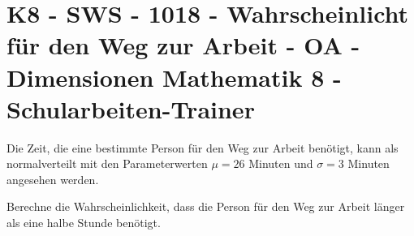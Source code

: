 \section{K8 - SWS - 1018 - Wahrscheinlicht für den Weg zur Arbeit - OA - Dimensionen Mathematik 8 - Schularbeiten-Trainer}

\begin{beispiel}[K8 - SWS]{1}
Die Zeit, die eine bestimmte Person für den Weg zur Arbeit benötigt, kann als normalverteilt mit den Parameterwerten $\mu=26$ Minuten und $\sigma=3$ Minuten angesehen werden.

Berechne die Wahrscheinlichkeit, dass die Person für den Weg zur Arbeit länger als eine halbe Stunde benötigt.

\end{beispiel}